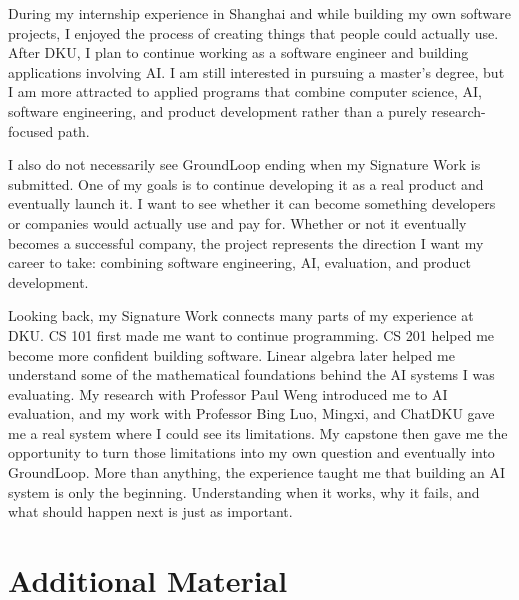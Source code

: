 \documentclass[12pt, a4paper, oneside]{report}
\newcommand{\instructions}[1]{}
\begin{document}
During my internship experience in Shanghai and while building my own software projects, I enjoyed the process of creating things that people could actually use. After DKU, I plan to continue working as a software engineer and building applications involving AI. I am still interested in pursuing a master's degree, but I am more attracted to applied programs that combine computer science, AI, software engineering, and product development rather than a purely research-focused path.

I also do not necessarily see GroundLoop ending when my Signature Work is submitted. One of my goals is to continue developing it as a real product and eventually launch it. I want to see whether it can become something developers or companies would actually use and pay for. Whether or not it eventually becomes a successful company, the project represents the direction I want my career to take: combining software engineering, AI, evaluation, and product development.

Looking back, my Signature Work connects many parts of my experience at DKU. CS 101 first made me want to continue programming. CS 201 helped me become more confident building software. Linear algebra later helped me understand some of the mathematical foundations behind the AI systems I was evaluating. My research with Professor Paul Weng introduced me to AI evaluation, and my work with Professor Bing Luo, Mingxi, and ChatDKU gave me a real system where I could see its limitations. My capstone then gave me the opportunity to turn those limitations into my own question and eventually into GroundLoop. More than anything, the experience taught me that building an AI system is only the beginning. Understanding when it works, why it fails, and what should happen next is just as important.



\appendix

\chapter{Additional Material}
\label{appendix-a}


\instructions{If you have an Overleaf account (either free or paid) you can use this file to start a new Overleaf project.

If you do not want an Overleaf account you can install TeX on your computer and use the template files provided by the Office of Signature Work.}
\end{document}
